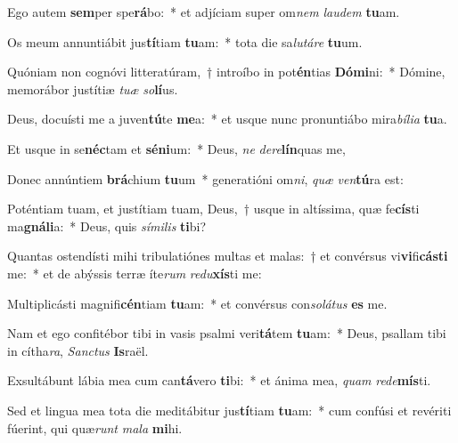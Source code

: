 \item Ego autem \textbf{sem}per spe\textbf{rá}bo:~* et adjíciam super om\textit{nem} \textit{lau}\textit{dem} \textbf{tu}am.
\item Os meum annuntiábit jus\textbf{tí}tiam \textbf{tu}am:~* tota die sa\textit{lu}\textit{tá}\textit{re} \textbf{tu}um.
\item Quóniam non cognóvi litteratúram,~† introíbo in pot\textbf{én}tias \textbf{Dó}\textbf{mi}ni:~* Dómine, memorábor justítiæ \textit{tu}\textit{æ} \textit{so}\textbf{lí}us.
\item Deus, docuísti me a juven\textbf{tú}te \textbf{me}a:~* et usque nunc pronuntiábo mira\textit{bí}\textit{li}\textit{a} \textbf{tu}a.
\item Et usque in se\textbf{néc}tam et \textbf{sé}\textbf{ni}um:~* Deus, \textit{ne} \textit{de}\textit{re}\textbf{lín}quas me,
\item Donec annúntiem \textbf{brá}chium \textbf{tu}um~* generatióni om\textit{ni}, \textit{quæ} \textit{ven}\textbf{tú}ra est:
\item Poténtiam tuam, et justítiam tuam, Deus,~† usque in altíssima, quæ fe\textbf{cís}ti ma\textbf{gná}\textbf{li}a:~* Deus, quis \textit{sí}\textit{mi}\textit{lis} \textbf{ti}bi?
\item Quantas ostendísti mihi tribulatiónes multas et malas:~† et convérsus vi\textbf{vi}fi\textbf{cás}\textbf{ti} me:~* et de abýssis terræ íte\textit{rum} \textit{re}\textit{du}\textbf{xís}ti me:
\item Multiplicásti magnifi\textbf{cén}tiam \textbf{tu}am:~* et convérsus con\textit{so}\textit{lá}\textit{tus} \textbf{es} me.
\item Nam et ego confitébor tibi in vasis psalmi veri\textbf{tá}tem \textbf{tu}am:~* Deus, psallam tibi in cítha\textit{ra}, \textit{Sanc}\textit{tus} \textbf{Is}raël.
\item Exsultábunt lábia mea cum can\textbf{tá}vero \textbf{ti}bi:~* et ánima mea, \textit{quam} \textit{red}\textit{e}\textbf{mís}ti.
\item Sed et lingua mea tota die meditábitur jus\textbf{tí}tiam \textbf{tu}am:~* cum confúsi et revériti fúerint, qui quæ\textit{runt} \textit{ma}\textit{la} \textbf{mi}hi.
